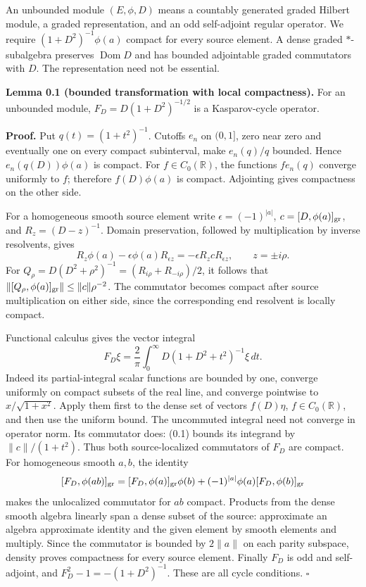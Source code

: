 \documentclass[
  11pt,
]{article}
\begin{document}
An unbounded module \((E,\phi,D)\) means a countably generated graded
Hilbert module, a graded representation, and an odd self-adjoint regular
operator. We require \((1+D^2)^{-1}\phi(a)\) compact for every source
element. A dense graded \(*\)-subalgebra preserves
\(\operatorname{Dom}D\) and has bounded adjointable graded commutators
with \(D\). The representation need not be essential.

\textbf{Lemma 0.1 (bounded transformation with local compactness).} For
an unbounded module, \(F_D=D(1+D^2)^{-1/2}\) is a Kasparov-cycle
operator.

\textbf{Proof.} Put \(q(t)=(1+t^2)^{-1}\). Cutoffs \(e_n\) on \((0,1]\),
zero near zero and eventually one on every compact subinterval, make
\(e_n(q)/q\) bounded. Hence \(e_n(q(D))\phi(a)\) is compact. For
\(f\in C_0(\mathbb R)\), the functions \(fe_n(q)\) converge uniformly to
\(f\); therefore \(f(D)\phi(a)\) is compact. Adjointing gives
compactness on the other side.

For a homogeneous smooth source element write \(\epsilon=(-1)^{|a|}\),
\(c=[D,\phi(a)]_{\rm gr}\), and \(R_z=(D-z)^{-1}\). Domain preservation,
followed by multiplication by inverse resolvents, gives \[
R_z\phi(a)-\epsilon\phi(a)R_{\epsilon z}
=-\epsilon R_zcR_{\epsilon z},\qquad z=\pm i\rho.
\tag{0.1}
\] For \(Q_\rho=D(D^2+\rho^2)^{-1}=(R_{i\rho}+R_{-i\rho})/2\), it
follows that \(\|[Q_\rho,\phi(a)]_{\rm gr}\|\leq\|c\|\rho^{-2}\). The
commutator becomes compact after source multiplication on either side,
since the corresponding end resolvent is locally compact.

Functional calculus gives the vector integral \[
F_D\xi=\frac2\pi\int_0^\infty
D(1+D^2+t^2)^{-1}\xi\,dt.
\tag{0.2}
\] Indeed its partial-integral scalar functions are bounded by one,
converge uniformly on compact subsets of the real line, and converge
pointwise to \(x/\sqrt{1+x^2}\). Apply them first to the dense set of
vectors \(f(D)\eta\), \(f\in C_0(\mathbb R)\), and then use the uniform
bound. The uncommuted integral need not converge in operator norm. Its
commutator does: (0.1) bounds its integrand by \(\|c\|/(1+t^2)\). Thus
both source-localized commutators of \(F_D\) are compact. For
homogeneous smooth \(a,b\), the identity \[
[F_D,\phi(ab)]_{\rm gr}
=[F_D,\phi(a)]_{\rm gr}\phi(b)
 +(-1)^{|a|}\phi(a)[F_D,\phi(b)]_{\rm gr}
\] makes the unlocalized commutator for \(ab\) compact. Products from
the dense smooth algebra linearly span a dense subset of the source:
approximate an algebra approximate identity and the given element by
smooth elements and multiply. Since the commutator is bounded by
\(2\|a\|\) on each parity subspace, density proves compactness for every
source element. Finally \(F_D\) is odd and self-adjoint, and
\(F_D^2-1=-(1+D^2)^{-1}\). These are all cycle conditions. \(\square\)
\end{document}
